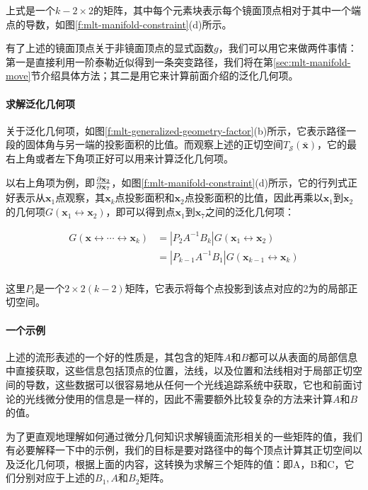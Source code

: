 \noindent 上式是一个$k-2\times 2$的矩阵，其中每个元素块表示每个镜面顶点相对于其中一个端点的导数，如图\ref{f:mlt-manifold-constraint}(d)所示。

有了上述的镜面顶点关于非镜面顶点的显式函数$g$，我们可以用它来做两件事情：第一是直接利用一阶泰勒近似得到一条突变路径，我们将在第\ref{sec:mlt-manifold-move}节介绍具体方法；其二是用它来计算前面介绍的泛化几何项。




\paragraph{求解泛化几何项}
关于泛化几何项，如图\ref{f:mlt-generalized-geometry-factor}(b)所示，它表示路径一段的固体角与另一端的投影面积的比值。而观察上述的正切空间$T_{\mathcal{S}}(\bar{\mathbf{x}})$，它的最右上角或者左下角项正好可以用来计算泛化几何项。

以右上角项为例，即$\frac{{\rm \partial} \mathbf{x}_2}{{\rm \partial} \mathbf{x}_7}$，如图\ref{f:mlt-manifold-constraint}(d)所示，它的行列式正好表示从$\mathbf{x}_1$点观察，其$\mathbf{x}_k$点投影面积和$\mathbf{x}_2$点投影面积的比值，因此再乘以$\mathbf{x}_1$到$\mathbf{x}_2$的几何项$G(\mathbf{x}_1\leftrightarrow\mathbf{x}_2)$，即可以得到点$\mathbf{x}_1$到$\mathbf{x}_7$之间的泛化几何项：

\begin{equation}
\begin{aligned}	
	G(\mathbf{x}\leftrightarrow\cdots\leftrightarrow\mathbf{x}_k)&=|P_2A^{-1}B_k|G(\mathbf{x}_1\leftrightarrow\mathbf{x}_2)\\
	&=|P_{k-1}A^{-1}B_1|G(\mathbf{x}_{k-1}\leftrightarrow\mathbf{x}_k)\\
\end{aligned}
\end{equation}

\noindent 这里$P_i$是一个$2\times 2(k-2)$矩阵，它表示将每个点投影到该点对应的2为的局部正切空间。




\paragraph{一个示例}
上述的流形表述的一个好的性质是，其包含的矩阵$A$和$B$都可以从表面的局部信息中直接获取，这些信息包括顶点的位置，法线，以及位置和法线相对于局部正切空间的导数，这些数据可以很容易地从任何一个光线追踪系统中获取，它也和前面讨论的光线微分使用的信息是一样的，因此不需要额外比较复杂的方法来计算$A$和$B$的值。

为了更直观地理解如何通过微分几何知识求解镜面流形相关的一些矩阵的值，我们有必要解释一下\cite{a:LIGHTTRANSPORTONPATHSPACEMANIFOLDS,a:ManifoldExplorationExpanded}中的示例，我们的目标是要对路径中的每个顶点计算其正切空间以及泛化几何项，根据上面的内容，这转换为求解三个矩阵的值：即A，B和C，它们分别对应于上述的$B_1,A$和$B_2$矩阵。

